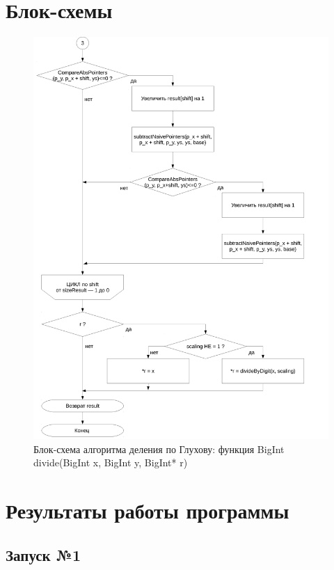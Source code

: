 \documentclass[a4paper,12pt]{article} %
\begin{document}
\section*{Блок-схемы}


\begin{figure}[ht]
	\includegraphics[width=\textwidth]{lr3_divide-3.pdf}
	\caption{Блок-схема алгоритма деления по Глухову: функция BigInt divide(BigInt x, BigInt y, BigInt* r)}
\end{figure}


\clearpage

\section*{Результаты работы программы}

\subsection*{Запуск №1}
\end{document}
